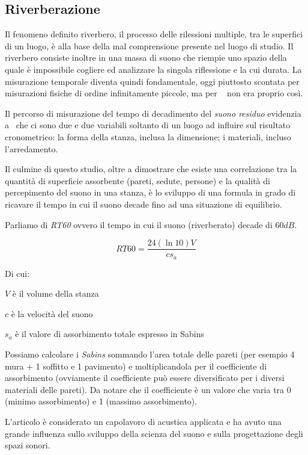 \subsection{Riverberazione}

Il fenomeno definito riverbero, il processo delle rilessioni multiple, tra le
superfici di un luogo, è alla base della mal comprensione presente nel luogo di
studio. Il riverbero consiste inoltre in una massa di suono che riempie uno
spazio della quale è impossibile cogliere ed analizzare la singola riflessione
e la cui durata. La misurazione temporale diventa quindi fondamentale, oggi
piuttosto scontata per misurazioni fisiche di ordine infinitamente piccole, ma
per \ws~ non era proprio così.

Il percorso di misurazione del tempo di decadimento del \emph{suono residuo}
evidenzia a \ws~che ci sono due e due variabili soltanto di un luogo  ad
influire sul risultato cronometrico: la forma della stanza, inclusa la
dimensione; i materiali, incluso l'arredamento.

Il culmine di questo studio, oltre a dimostrare che esiste una correlazione tra
la quantità di superficie assorbente (pareti, sedute, persone) e la qualità di
percepimento del suono in una stanza, è lo sviluppo di una formula in grado di
ricavare il tempo in cui il suono decade fino ad una situazione di equilibrio.

Parliamo di \emph{RT60} ovvero il tempo in cui il suono (riverberato) decade di
$60 dB$.

\begin{equation}
RT60 = \frac{24(\ln{10})V}{c s_a}
\end{equation}

Di cui:
\begin{compactitem}
\item $V$ è il volume della stanza
\item $c$ è la velocità del suono
\item $s_a$ è il valore di assorbimento totale espresso in Sabins
\end{compactitem}

Possiamo calcolare i \emph{Sabins} sommando l’area totale delle pareti (per
esempio 4 mura + 1 soffitto e 1 pavimento) e moltiplicandola per il coefficiente
di assorbimento (ovviamente il coefficiente può essere diversificato per i
diversi materiali delle pareti). Da notare che il coefficiente è un valore che
varia tra 0 (minimo assorbimento) e 1 (massimo assorbimento).

L’articolo è considerato un capolavoro di acustica applicata e ha avuto una
grande influenza sullo sviluppo della scienza del suono e sulla progettazione
degli spazi sonori.

